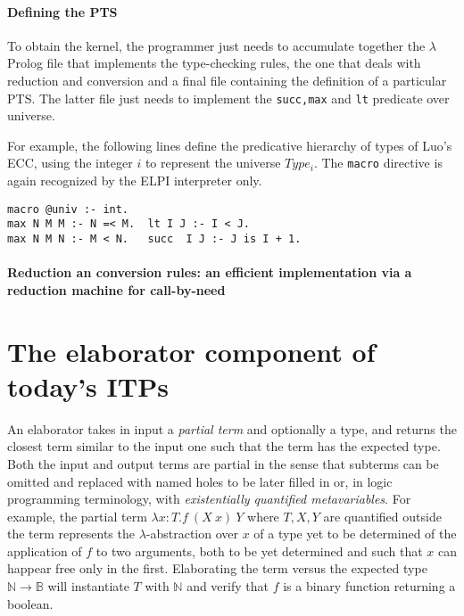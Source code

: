 \documentclass{easychair}
\begin{document}

\paragraph{Defining the PTS}\label{sec:eccpts}
To obtain the kernel, the programmer just needs to accumulate together the $\lambda$Prolog file that implements the type-checking rules, the one that deals with reduction and conversion and a final file containing the definition of a particular PTS. The latter file just needs to implement the \verb+succ,max+ and \verb+lt+ predicate over universe.

For example, the following lines define the predicative hierarchy of types of Luo's ECC, using the integer $i$ to represent the universe $Type_i$. The \verb+macro+ directive is again recognized by the ELPI interpreter only.
\begin{Verbatim}
macro @univ :- int.
max N M M :- N =< M.  lt I J :- I < J.
max N M N :- M < N.   succ  I J :- J is I + 1.
\end{Verbatim}

\paragraph{Reduction an conversion rules: an efficient implementation via a reduction machine for call-by-need}\label{sec:kernelmachine}



\section{The elaborator component of today's ITPs}\label{sec:problems}

An elaborator takes in input a \emph{partial term} and optionally a
type, and returns the closest term similar to the input one such that
the term has the expected type. Both the input and output terms are
partial in the sense that subterms can be omitted and replaced with
named holes to be later filled in or, in logic programming
terminology, with \emph{existentially quantified metavariables}. For
example, the partial term $\lambda x: T. f~(X~x)~Y$ where $T,X,Y$ are
quantified outside the term represents the $\lambda$-abstraction over
$x$ of a type yet to be determined of the application of $f$ to two
arguments, both to be yet determined and such that $x$ can happear
free only in the first. Elaborating the term versus the expected type
$\mathbb{N} \to \mathbb{B}$ will instantiate $T$ with $\mathbb{N}$ and
verify that $f$ is a binary function returning a boolean.
\end{document}
